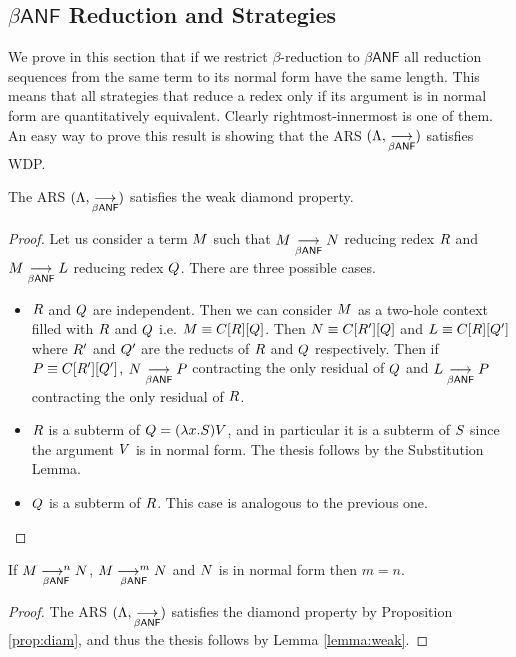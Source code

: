\begin{LONG}
	\subsection{$\beta\textsf{ANF}$ Reduction and Strategies}
	We prove in this section that if we restrict $\beta$-reduction to $\beta\mathsf{ANF}$ all reduction sequences from the same term to its normal form have the same length. This means that all strategies that reduce a redex only if its argument is in normal form are quantitatively equivalent. Clearly rightmost-innermost is one of them. An easy way to prove this result is showing that the ARS $(\Lambda, \underset{\beta\textsf{ANF}}{\longrightarrow})$ satisfies WDP.
	\begin{proposition}\label{prop:diam}
		The ARS $(\Lambda, \underset{\beta\textsf{ANF}}{\longrightarrow})$ satisfies the weak diamond property.
	\end{proposition}
	\begin{proof}
		Let us consider a term $M$ such that $M\underset{\beta\textsf{ANF}}{\longrightarrow}N$ reducing redex $R$ and $M\underset{\beta\textsf{ANF}}{\longrightarrow}L$ reducing redex $Q$. There are three possible cases.
		\begin{itemize}
			\item $R$ and $Q$ are independent. Then we can consider $M$ as a two-hole context filled with $R$ and $Q$ i.e. $M\equiv C[R][Q]$. Then $N\equiv C[R'][Q]$ and $L\equiv C[R][Q']$ where $R'$ and $Q'$ are the reducts of $R$ and $Q$ respectively. Then if $P\equiv C[R'][Q']$, $N\underset{\beta\textsf{ANF}}{\longrightarrow}P$ contracting the only residual of $Q$ and $L\underset{\beta\textsf{ANF}}{\longrightarrow}P$ contracting the only residual of $R$.
			\item $R$ is a subterm of $Q=(\lambda x.S)V$, and in particular it is a subterm of $S$ since the argument $V$ is in normal form. The thesis follows by the Substitution Lemma.
			\item $Q$ is a subterm of $R$. This case is analogous to the previous one.
		\end{itemize}
	\end{proof}
	\begin{corollary}\label{corollary:equiv}
		If $M\underset{\beta\textsf{ANF}}{\longrightarrow^{n}}N$, $M\underset{\beta\textsf{ANF}}{\longrightarrow^{m}}N$ and $N$ is in normal form then $m=n$.
	\end{corollary}
	\begin{proof}
		The ARS $(\Lambda, \underset{\beta\textsf{ANF}}{\longrightarrow})$ satisfies the diamond property by Proposition \ref{prop:diam}, and thus the thesis follows by Lemma \ref{lemma:weak}.
	\end{proof}
\end{LONG}

